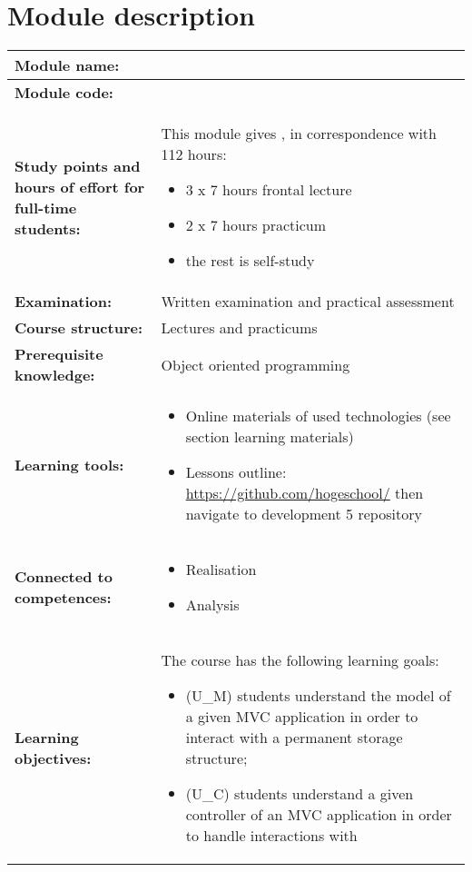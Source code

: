 \section*{Module description}
\begin{tabularx}{\textwidth}{|>{\columncolor{lichtGrijs}} p{}|X|}
	\hline
	\textbf{Module name:} & \modulenaam\\
	\hline
	\textbf{Module code: }& \modulecode\\
	\hline
	\textbf{Study points \newline and hours of effort for full-time students:} & This module gives \stdPunten, in correspondence with 112 hours:
	\begin{itemize}
		\item 3 x 7 hours frontal lecture
		\item 2 x 7 hours practicum 
		\item the rest is self-study
	\end{itemize} \\
	\hline
	\textbf{Examination:} & Written examination and practical assessment \\
	\hline
	\textbf{Course structure:} & Lectures and practicums\\
	\hline
	\textbf{Prerequisite knowledge:} & Object oriented programming \\
	\hline
	\textbf{Learning tools:} & \begin{itemize}
			\item  Online materials of used technologies (see section learning materials) 
			\item  Lessons outline: 
  \url{https://github.com/hogeschool/} then navigate to development 5 repository
		\end{itemize} \\
	\hline
	\textbf{Connected to \newline competences:} & \begin{itemize}
			\item Realisation
			\item Analysis
		\end{itemize} \\
	\hline
	\textbf{Learning objectives:} &
		The course has the following learning goals: 
			\begin{itemize}
					\item (U\_M) students understand the model of a given MVC application in order to interact with a permanent storage structure; 
					\item (U\_C) students understand a given controller of an MVC application in order to handle interactions with

\end{itemize}
\end{tabularx}
